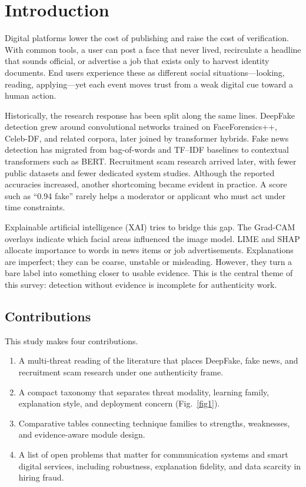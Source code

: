 \documentclass[runningheads]{llncs}
\begin{document}
\section{Introduction}
Digital platforms lower the cost of publishing and raise the cost of verification. With common tools, a user can post a face that never lived, recirculate a headline that sounds official, or advertise a job that exists only to harvest identity documents. End users experience these as different social situations---looking, reading, applying---yet each event moves trust from a weak digital cue toward a human action.

Historically, the research response has been split along the same lines. DeepFake detection grew around convolutional networks trained on FaceForensics++, Celeb-DF, and related corpora, later joined by transformer hybrids. Fake news detection has migrated from bag-of-words and TF--IDF baselines to contextual transformers such as BERT. Recruitment scam research arrived later, with fewer public datasets and fewer dedicated system studies. Although the reported accuracies increased, another shortcoming became evident in practice. A score such as ``0.94 fake'' rarely helps a moderator or applicant who must act under time constraints.

Explainable artificial intelligence (XAI) tries to bridge this gap. The Grad-CAM overlays indicate which facial areas influenced the image model. LIME and SHAP allocate importance to words in news items or job advertisements. Explanations are imperfect; they can be coarse, unstable or misleading. However, they turn a bare label into something closer to usable evidence. This is the central theme of this survey: detection without evidence is incomplete for authenticity work.

\subsection{Contributions}
This study makes four contributions.
\begin{enumerate}
\item A multi-threat reading of the literature that places DeepFake, fake news, and recruitment scam research under one authenticity frame.
\item A compact taxonomy that separates threat modality, learning family, explanation style, and deployment concern (Fig.~\ref{fig1}).
\item Comparative tables connecting technique families to strengths, weaknesses, and evidence-aware module design.
\item A list of open problems that matter for communication systems and smart digital services, including robustness, explanation fidelity, and data scarcity in hiring fraud.
\end{enumerate}
\end{document}
